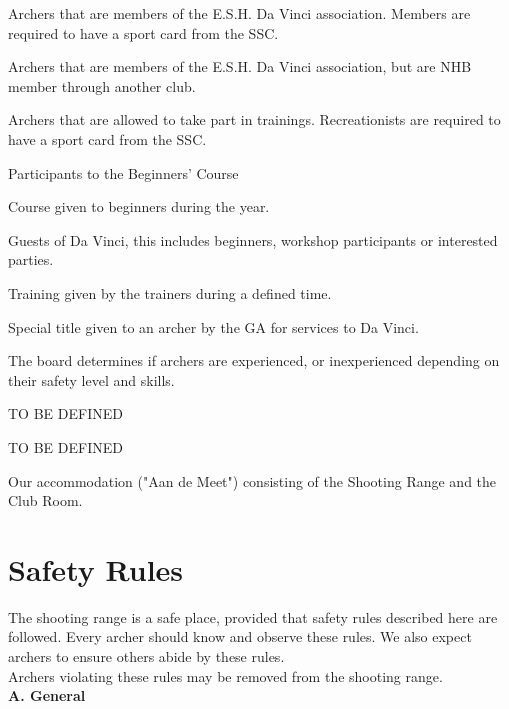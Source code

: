 \documentclass[a4paper]{article}
\begin{document}
\begin{description}[font=\sffamily\bfseries, leftmargin=1cm, style=nextline]
\item[Member]
Archers that are members of the E.S.H. Da Vinci association. Members are required to have a sport card from the SSC.
\item[External Member]
Archers that are members of the E.S.H. Da Vinci association, but are NHB member through another club.
\item[Recreationist]
Archers that are allowed to take part in trainings. Recreationists are required to have a sport card from the SSC.
\item[Beginner]
Participants to the Beginners' Course
\item[Beginners' Course] Course given to beginners during the year.
\item[Guest] Guests of Da Vinci, this includes beginners, workshop participants or interested parties.
\item[General Training] Training given by the trainers during a defined time.
\item[Honorary Member] Special title given to an archer by the GA for services to Da Vinci.
\item[Experienced - Inexperienced] The board determines if archers are experienced, or inexperienced depending on their safety level and skills.
\item[Supervisor] TO BE DEFINED
\item[Downrange] TO BE DEFINED
\item[Accomodation] Our accommodation ("Aan de Meet") consisting of the Shooting Range and the Club Room.
\end{description}

\section{Safety Rules}
The shooting range is a safe place, provided that safety rules described here are followed. Every archer should know and observe these rules. We also expect archers to ensure others abide by these rules. \\

Archers violating these rules may be removed from the shooting range. \\



{\bf A. General}
\end{document}
